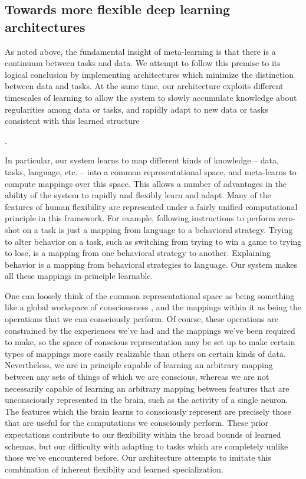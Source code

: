 \documentclass[11pt]{article}
\begin{document}
\subsection{Towards more flexible deep learning architectures}

As noted above, the fundamental insight of meta-learning is that there is a continuum between tasks and data. We attempt to follow this premise to its logical conclusion by implementing architectures which minimize the distinction between data and tasks. At the same time, our architecture exploits different timescales of learning to allow the system to slowly accumulate knowledge about regularities among data or tasks, and rapidly adapt to new data or tasks consistent with this learned structure \par.

In particular, our system learns to map different kinds of knowledge -- data, tasks, language, etc. -- into a common representational space, and meta-learns to compute mappings over this space. This allows a number of advantages in the ability of the system to rapidly and flexibly learn and adapt. Many of the features of human flexibility are represented under a fairly unified computational principle in this framework. For example, following instructions to perform zero-shot on a task is just a mapping from language to a behavioral strategy. Trying to alter behavior on a task, such as switching from trying to win a game to trying to lose, is a mapping from one behavioral strategy to another. Explaining behavior is a mapping from behavioral strategies to language. Our system makes all these mappings in-principle learnable. \par 

One can loosely think of the common representational space as being something like a global workspace of consciousness \citep{Baars2005, Dehaene2017}, and the mappings within it as being the operations that we can consciously perform. Of course, these operations are constrained by the experiences we've had and the mappings we've been required to make, so the space of conscious representation may be set up to make certain types of mappings more easily realizable than others on certain kinds of data. Nevertheless, we are in principle capable of learning an arbitrary mapping between any sets of things of which we are conscious, whereas we are not necessarily capable of learning an arbitrary mapping between features that are unconsciously represented in the brain, such as the activity of a single neuron. The features which the brain learns to consciously represent are precisely those that are useful for the computations we consciously perform. These prior expectations contribute to our flexibility within the broad bounds of learned schemas, but our difficulty with adapting to tasks which are completely unlike those we've encountered before. Our architecture attempts to imitate this combination of inherent flexiblity and learned specialization. \par  
\end{document}
